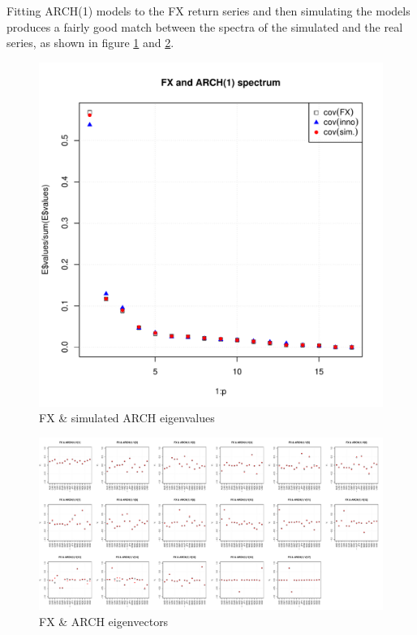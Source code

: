 \documentclass{article}
\begin{document}
Fitting ARCH(1) models to the FX return series and then simulating the
models produces a fairly good match between the spectra of the
simulated and the real series, as shown in figure
\ref{fig:FX_ARCH_eigenvalues} and \ref{fig:FX_ARCH_eigenvectors}.
\begin{figure}[htb!]
  \centering
  \includegraphics[scale=0.4]{FX_eigenvalues.pdf}  
  \caption{FX \& simulated ARCH eigenvalues}
  \label{fig:FX_ARCH_eigenvalues}
\end{figure}

\begin{figure}[htb!]
  \centering
  \includegraphics[scale=0.3]{FX_eigenvectors}  
  \caption{FX \& ARCH eigenvectors}
  \label{fig:FX_ARCH_eigenvectors}
\end{figure}
\end{document}
